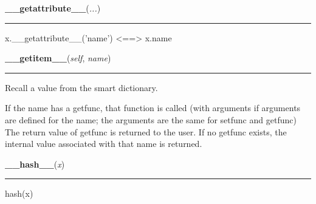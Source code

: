     \vspace{0.5ex}

    \begin{boxedminipage}{\textwidth}

    \raggedright \textbf{\_\_getattribute\_\_}(\textit{...})

    \vspace{-1.5ex}

    \rule{\textwidth}{0.5\fboxrule}
    x.\_\_getattribute\_\_('name') {\textless}=={\textgreater} x.name

    \vspace{1ex}

    \end{boxedminipage}

    \label{DataDict:DataDict:__getitem__}

    \vspace{0.5ex}

    \begin{boxedminipage}{\textwidth}

    \raggedright \textbf{\_\_getitem\_\_}(\textit{self}, \textit{name})

    \vspace{-1.5ex}

    \rule{\textwidth}{0.5\fboxrule}
    Recall a value from the smart dictionary.

    If the name has a getfunc, that function is called (with arguments if 
    arguments are defined for the name; the arguments are the same for 
    setfunc and getfunc) The return value of getfunc is returned to the 
    user. If no getfunc exists, the internal value associated with that 
    name is returned.

    \vspace{1ex}

    \end{boxedminipage}

    \label{object:__hash__}

    \vspace{0.5ex}

    \begin{boxedminipage}{\textwidth}

    \raggedright \textbf{\_\_hash\_\_}(\textit{x})

    \vspace{-1.5ex}

    \rule{\textwidth}{0.5\fboxrule}
    hash(x)

    \vspace{1ex}

    \end{boxedminipage}

